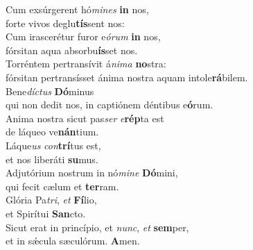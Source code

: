 \evenverse Cum exsúrgerent hó\textit{mi}\textit{nes} \textbf{in} nos,~\*\\
\evenverse forte vivos deglu\textbf{tís}sent nos:\\
\oddverse Cum irascerétur furor e\textit{ó}\textit{rum} \textbf{in} nos,~\*\\
\oddverse fórsitan aqua absorbu\textbf{ís}set nos.\\
\evenverse Torréntem pertransívit á\textit{ni}\textit{ma} \textbf{no}stra:~\*\\
\evenverse fórsitan pertransísset ánima nostra aquam intole\textbf{rá}bilem.\\
\oddverse Bene\textit{dí}\textit{ctus} \textbf{Dó}minus~\*\\
\oddverse qui non dedit nos, in captiónem déntibus e\textbf{ó}rum.\\
\evenverse Anima nostra sicut pas\textit{ser} \textit{e}\textbf{rép}ta est~\*\\
\evenverse de láqueo ve\textbf{nán}tium.\\
\oddverse Láque\textit{us} \textit{con}\textbf{trí}tus est,~\*\\
\oddverse et nos liberáti \textbf{su}mus.\\
\evenverse Adjutórium nostrum in nó\textit{mi}\textit{ne} \textbf{Dó}mini,~\*\\
\evenverse qui fecit cælum et \textbf{ter}ram.\\
\oddverse Glória Pa\textit{tri}, \textit{et} \textbf{Fí}lio,~\*\\
\oddverse et Spirítui \textbf{San}cto.\\
\evenverse Sicut erat in princípio, et \textit{nunc}, \textit{et} \textbf{sem}per,~\*\\
\evenverse et in sǽcula sæculórum. \textbf{A}men.\\
